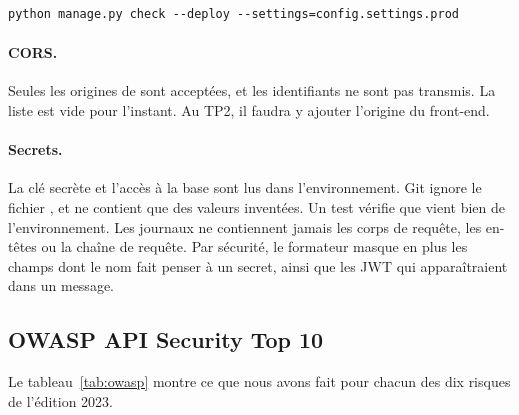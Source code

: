 \begin{lstlisting}[language={},caption={Vérification de la configuration de production.},label={lst:deploy}]
python manage.py check --deploy --settings=config.settings.prod
\end{lstlisting}

\paragraph{CORS.} Seules les origines de  sont acceptées, et les identifiants ne sont pas transmis. La liste est vide pour l'instant. Au TP2, il faudra y ajouter l'origine du front-end.

\paragraph{Secrets.} La clé secrète et l'accès à la base sont lus dans l'environnement. Git ignore le fichier , et  ne contient que des valeurs inventées. Un test vérifie que  vient bien de l'environnement. Les journaux ne contiennent jamais les corps de requête, les en-têtes ou la chaîne de requête. Par sécurité, le formateur masque en plus les champs dont le nom fait penser à un secret, ainsi que les JWT qui apparaîtraient dans un message.

\subsection{OWASP API Security Top 10}

Le tableau~\ref{tab:owasp} montre ce que nous avons fait pour chacun des dix risques de l'édition 2023.

